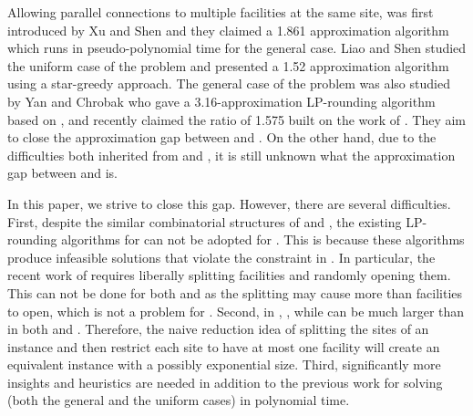 \documentclass[10pt]{llncs}
\begin{document}
Allowing parallel connections to multiple facilities at the same site,
 was first introduced by Xu and Shen \cite{shihongftfa}
and they claimed a 1.861 approximation algorithm which runs in pseudo-polynomial
time for the general case. Liao and Shen \cite{kewen2011cocoon} studied
the uniform case of the problem and presented a 1.52 approximation
algorithm using a star-greedy approach. The general case of the problem
was also studied by Yan and Chrobak \cite{yan2011approximation} who
gave a 3.16-approximation LP-rounding algorithm based on \cite{Shmoys97FL,Chudak0312e},
and recently claimed the ratio of 1.575 \cite{yan2012lp} built on
the work of \cite{Chudak0312e,jaroslaw2010optimal,jaroslaw2012lp,Guha03FTFL2.41}.
They aim to close the approximation gap between  and
. On the other hand, due to the difficulties both inherited
from  and , it is still unknown what the approximation
gap between  and  is.

In this paper, we strive to close this gap. However, there are several
difficulties. First, despite the similar combinatorial structures
of  and , the existing LP-rounding algorithms
\cite{yan2011approximation,yan2012lp} for  can not
be adopted for . This is because these algorithms produce infeasible
solutions that violate the constraint  in . In particular,
the recent work of \cite{yan2012lp} requires liberally splitting
facilities and randomly opening them. This can not be done for both
 and  as the splitting may cause more than 
facilities to open, which is not a problem for . Second,
in , , while 
can be much larger than  in both  and .
Therefore, the naive reduction idea of splitting the sites of an 
instance and then restrict each site to have at most one facility
will create an equivalent  instance with a possibly exponential
size. Third, significantly more insights and heuristics are needed
in addition to the previous work for solving  (both the general
and the uniform cases) in polynomial time.
\end{document}
